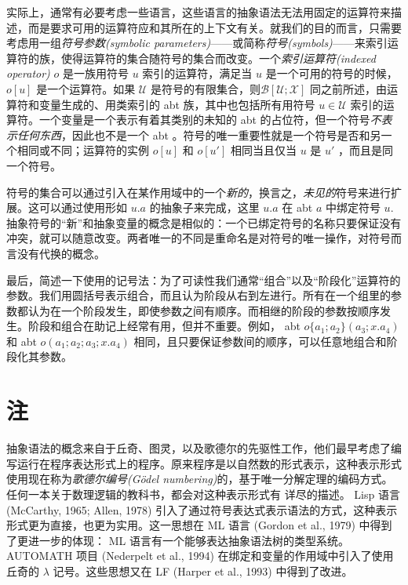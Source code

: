 实际上，通常有必要考虑一些语言，这些语言的抽象语法无法用固定的运算符来描述，而是要求可用的运算符应和其所在的上下文有关。就我们的目的而言，只需要考虑用一组\emph{符号参数(symbolic
parameters)}------或简称\emph{符号(symbols)}------来索引运算符的族，使得运算符的集合随符号的集合而改变。一个\emph{索引运算符(indexed
operator)} \(o\) 是一族用符号 \(u\) 索引的运算符，满足当 \(u\)
是一个可用的符号的时候，\(o[u]\) 是一个运算符。如果 \(\mathcal{U}\)
是符号的有限集合，则\(\mathcal{B[U;X]}\)
同之前所述，由运算符和变量生成的、用类索引的 abt
族，其中也包括所有用符号 \(u\in \mathcal{U}\)
索引的运算符。一个变量是一个表示有着其类别的未知的 abt
的占位符，但一个符号\emph{不表示任何东西}，因此也不是一个 abt
。符号的唯一重要性就是一个符号是否和另一个相同或不同；运算符的实例
\(o[u]\) 和 \(o[u']\) 相同当且仅当 \(u\) 是 \(u'\) ，而且是同一个符号。

符号的集合可以通过引入在某作用域中的一个\emph{新的}，换言之，\emph{未见的}符号来进行扩展。这可以通过使用形如
\(u.a\) 的抽象子来完成，这里 \(u.a\) 在 abt \(a\) 中绑定符号 \(u\).
抽象符号的``新''和抽象变量的概念是相似的：一个已绑定符号的名称只要保证没有冲突，就可以随意改变。两者唯一的不同是重命名是对符号的唯一操作，对符号而言没有代换的概念。

最后，简述一下使用的记号法：为了可读性我们通常``组合''以及``阶段化''运算符的参数。我们用圆括号表示组合，而且认为阶段从右到左进行。所有在一个组里的参数都认为在一个阶段发生，即使参数之间有顺序。而相继的阶段的参数按顺序发生。阶段和组合在助记上经常有用，但并不重要。例如，
abt \(o\{a_1;a_2\}(a_3;x.a_4)\) 和 abt \(o(a_1;a_2;a_3;x.a_4)\)
相同，且只要保证参数间的顺序，可以任意地组合和阶段化其参数。

\section{注}

抽象语法的概念来自于丘奇、图灵，以及歌德尔的先驱性工作，他们最早考虑了编写运行在程序表达形式上的程序。原来程序是以自然数的形式表示，这种表示形式使用现在称为\emph{歌德尔编号(Gödel numbering)}的，基于唯一分解定理的编码方式。任何一本关于数理逻辑的教科书，都会对这种表示形式有
详尽的描述。 Lisp 语言(McCarthy, 1965; Allen, 1978) 引入了通过符号表达式表示语法的方式，这种表示形式更为直接，也更为实用。这一思想在 ML 语言 (Gordon et al., 1979) 中得到了更进一步的体现： ML 语言有一个能够表达抽象语法树的类型系统。 AUTOMATH 项目 (Nederpelt et al., 1994) 在绑定和变量的作用域中引入了使用丘奇的 $\lambda$ 记号。这些思想又在 LF (Harper et al., 1993) 中得到了改进。

